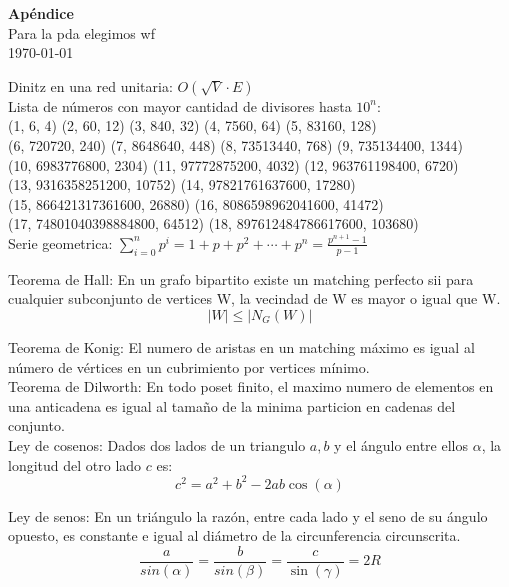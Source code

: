 \begin{center}
    {\Large\textbf{Apéndice}} \\ \vspace{.5em}
    {\large Para la pda elegimos wf} \\ \vspace{.5em}
    \today \vspace{1em}
\end{center}

\setlength{\parindent}{0pt}

Dinitz en una red unitaria: $O(\sqrt{V}\cdot E)$ \\

Lista de números con mayor cantidad de divisores hasta $10^n$:\\[0.5em]
(1, 6, 4) (2, 60, 12) (3, 840, 32) (4, 7560, 64) (5, 83160, 128)\\
(6, 720720, 240) (7, 8648640, 448) (8, 73513440, 768) (9, 735134400, 1344)\\
(10, 6983776800, 2304) (11, 97772875200, 4032) (12, 963761198400, 6720)\\
(13, 9316358251200, 10752) (14, 97821761637600, 17280)\\
(15, 866421317361600, 26880) (16, 8086598962041600, 41472) \\
(17, 74801040398884800, 64512) (18, 897612484786617600, 103680)\\

Serie geometrica: $\sum_{i=0}^n p^i = 1 + p + p^2 + \cdots + p^n = \frac{p^{n+1}-1}{p-1}$

Teorema de Hall: En un grafo bipartito existe un matching perfecto sii para cualquier subconjunto de vertices W, la vecindad de W es mayor o igual que W. $$ |W| \leq |N_G(W)| $$

Teorema de Konig: El numero de aristas en un matching máximo es igual al número de vértices en un cubrimiento por vertices mínimo.\\

Teorema de Dilworth: En todo poset finito, el maximo numero de elementos en una anticadena es igual al tamaño de la minima particion en cadenas del conjunto. \\

Ley de cosenos: Dados dos lados de un triangulo $a, b$ y el ángulo entre ellos $\alpha$, la longitud del otro lado $c$ es: $$ c^2 = a^2 + b^2 - 2ab \cos(\alpha) $$

Ley de senos: En un triángulo la razón, entre cada lado y el seno de su ángulo opuesto, es constante e igual al diámetro de la circunferencia circunscrita.  $$ \frac{a}{sin(\alpha)} = \frac{b}{sin(\beta)} = \frac{c}{\sin(\gamma)} = 2R $$

